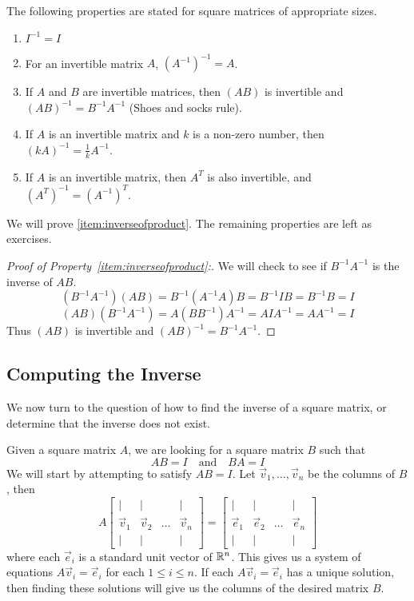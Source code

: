 \documentclass{ximera}
\begin{document}
\begin{theorem}\label{th:invprop} The following properties are stated for square matrices of appropriate sizes.
\begin{enumerate}
\item \label{item:inverseofid} $I^{-1}=I$
\item \label{item:inverseofinverse} For an invertible matrix $A$, $(A^{-1})^{-1}=A$.
\item \label{item:inverseofproduct} If $A$ and $B$ are invertible matrices, then $(AB)$ is invertible and $(AB)^{-1}=B^{-1}A^{-1}$ (Shoes and socks rule).
\item \label{item:inversekA} If $A$ is an invertible matrix and $k$ is a non-zero number, then $(kA)^{-1}=\frac{1}{k}A^{-1}$.
\item \label{item:inversetranspose} If $A$ is an invertible matrix, then $A^T$ is also invertible, and $(A^T)^{-1}=(A^{-1})^T$.
\end{enumerate}
\end{theorem}
We will prove \ref{item:inverseofproduct}.  The remaining properties are left as exercises.
\begin{proof}[Proof of Property~\ref{item:inverseofproduct}:]
We will check to see if $B^{-1}A^{-1}$ is the inverse of $AB$.
$$(B^{-1}A^{-1})(AB)=B^{-1}(A^{-1}A)B=B^{-1}IB=B^{-1}B=I$$
$$(AB)(B^{-1}A^{-1})=A(BB^{-1})A^{-1}=AIA^{-1}=AA^{-1}=I$$
Thus $(AB)$ is invertible and $(AB)^{-1}=B^{-1}A^{-1}$.
\end{proof}

\subsection*{Computing the Inverse}
We now turn to the question of how to find the inverse of a square matrix, or determine that the inverse does not exist.  

Given a square matrix $A$, we are looking for a square matrix $B$ such that $$AB=I\quad\text{and}\quad BA=I$$
We will start by attempting to satisfy $AB=I$.
Let $\vec{v}_1,\ldots,\vec{v}_n$ be the columns of $B$, then
$$A\begin{bmatrix}
           | & |& &|\\
		\vec{v}_1 & \vec{v}_2 &\dots &\vec{v}_n\\
		|&| & &|
         \end{bmatrix}=\begin{bmatrix}
           | & |& &|\\
		\vec{e}_1 & \vec{e}_2 &\dots &\vec{e}_n\\
		|&| & &|
         \end{bmatrix}$$
where each $\vec{e}_i$ is a standard unit vector of $\mathbb{R}^n$.   This gives us a system of equations $A\vec{v}_i=\vec{e}_i$ for each $1\leq i\leq n$.  If each $A\vec{v}_i=\vec{e}_i$ has a unique solution, then finding these solutions will give us the columns of the desired matrix $B$.  
\end{document}
